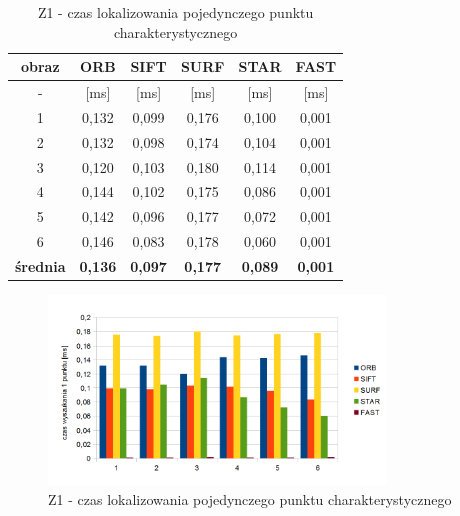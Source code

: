 \begin{table}[htbp]
  \centering
  \caption{Z1 - czas lokalizowania pojedynczego punktu charakterystycznego}
    \begin{tabular}{|c|c|c|c|c|c|}
    \hline
    obraz & \textbf{ORB} & \textbf{SIFT} & \textbf{SURF} & \textbf{STAR} & \textbf{FAST} \\
    \hline
    -  & [ms] & [ms] & [ms] & [ms] & [ms] \\\hline
    1 & 0,132 & 0,099 & 0,176 & 0,100 & 0,001 \\
    2 & 0,132 & 0,098 & 0,174 & 0,104 & 0,001 \\
    3 & 0,120 & 0,103 & 0,180 & 0,114 & 0,001 \\
    4 & 0,144 & 0,102 & 0,175 & 0,086 & 0,001 \\
    5 & 0,142 & 0,096 & 0,177 & 0,072 & 0,001 \\
    6 & 0,146 & 0,083 & 0,178 & 0,060 & 0,001 \\\hline
    \textbf{średnia} & \textbf{0,136} & \textbf{0,097} & \textbf{0,177} & \textbf{0,089} & \textbf{0,001} \\
    \hline
    

    \end{tabular}%
  \label{tab:z1_f2}%
\end{table}%


\begin{figure}
\centering
\includegraphics[width=0.8\textwidth]{pict/slowik/z1/f2.png}
\caption{Z1 - czas lokalizowania pojedynczego punktu charakterystycznego}
\label{fig:z1_f2}
\end{figure}

